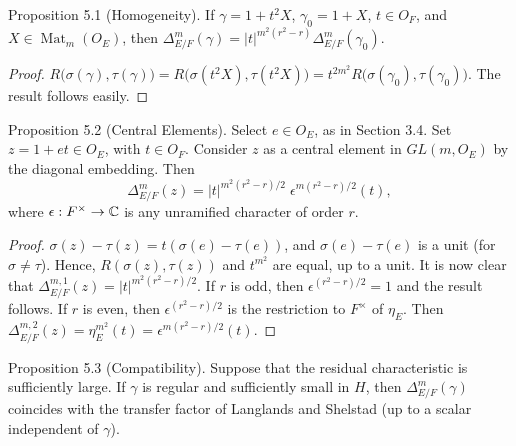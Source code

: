 \documentclass{amsart}
\begin{document}
\bigskip
\proclaim Proposition {5.1} (Homogeneity).
If
  $ \gamma = 1 + t^2 X $,
  $ \gamma_0 = 1 + X $,
  $ t \in O_F $, and 
  $ X \in \operatorname{Mat}_m (O_E) $,
then
  $ \Delta_{E/F}^m (\gamma) =
     |t|^{m^2 (r^2-r) } 
    \Delta_{E/F}^m (\gamma_0) $.
\finishproclaim

\begin{proof}
$  R 
  \bigl(
    \sigma (\gamma),\tau (\gamma) 
  \bigr)
=
  R 
  \bigl( 
    \sigma (t^2 X), \tau (t^2 X)
  \bigr) 
=
  t^{2m^2} R
  \bigl(
    \sigma (\gamma_0), \tau (\gamma_0)
  \bigr)
$.
%
The result follows easily.
\end{proof}


\bigskip
\proclaim Proposition {5.2} (Central Elements).
Select 
  $ e \in O_E $, as in Section 3.4.
Set
  $ z = 1 + e t\in O_E$, with $t\in O_F$.
Consider $z$ as a central element in 
  $ GL(m, O_E) $
by the diagonal embedding.
Then 
%
$$
  \Delta_{E/F}^m (z) =
  |t|^{ m^2 (r^2-r)/2 } \;
  \epsilon^{ m (r^2-r)/2 }(t),
$$
%
where
  $ \epsilon: F^{\times} \to {\Bbb C} $
is any unramified character 
of order $r$.
\finishproclaim

\begin{proof}
  $\sigma (z)- \tau (z) = t (\sigma(e)-\tau(e))$,
  and $\sigma(e)-\tau(e)$ is a unit (for $\sigma\ne\tau$).
Hence,
$R(\sigma(z),\tau(z))$ and $t^{m^2}$ are equal, up
to a unit.
%
It is now clear that
  $ \Delta_{E/F}^{m,1} (z) =
    | t|^{ m^2 (r^2-r)/2 } $.
If $r$ is odd, then
  $ \epsilon^{(r^2-r)/2} = 1 $
and the result follows.
If $r$ is even, then
  $ \epsilon^{(r^2-r)/2} $
is the restriction to
  $ F^{\times} $ 
of
  $ \eta_E $.
Then
  $ \Delta_{E/F}^{m,2} (z) =
    \eta_E^{m^2} (t) =
    \epsilon^{ m (r^2-r)/2 } (t) $.
\end{proof}


\bigskip
\proclaim Proposition {5.3} (Compatibility).
Suppose that the residual characteristic is sufficiently large.
If $ \gamma $ is regular and sufficiently small in
  $ H$, then 
$\Delta^m_{E/F}(\gamma)$ coincides with the transfer factor of Langlands
and Shelstad (up to a scalar independent of $\gamma$).
\finishproclaim
\end{document}
